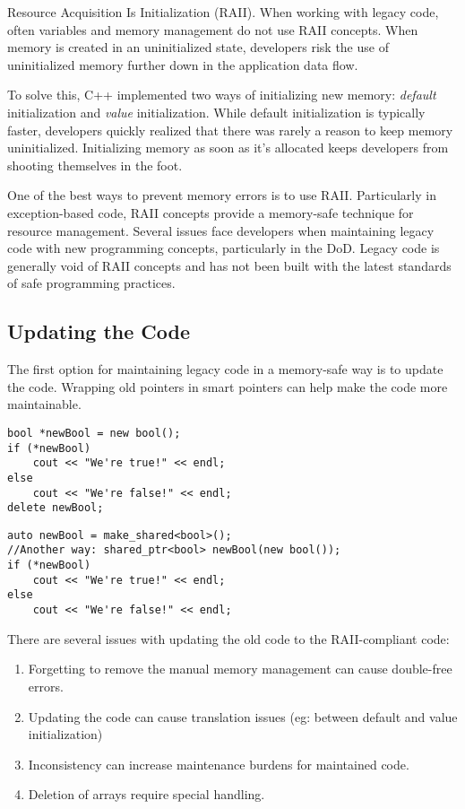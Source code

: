 Resource Acquisition Is Initialization (RAII). When working with legacy code, often variables and memory management do not use RAII concepts. When memory is created in an uninitialized state, developers risk the use of uninitialized memory further down in the application data flow.

To solve this, C++ implemented two ways of initializing new memory: \textit{default} initialization and \textit{value} initialization. While default initialization is typically faster, developers quickly realized that there was rarely a reason to keep memory uninitialized. Initializing memory as soon as it's allocated keeps developers from shooting themselves in the foot.

One of the best ways to prevent memory errors is to use RAII. Particularly in exception-based code, RAII concepts provide a memory-safe technique for resource management.\autocite{20210412-stroustrup2001} Several issues face developers when maintaining legacy code with new programming concepts, particularly in the DoD. Legacy code is generally void of RAII concepts and has not been built with the latest standards of safe programming practices.

\subsection{Updating the Code}

The first option for maintaining legacy code in a memory-safe way is to update the code. Wrapping old pointers in smart pointers can help make the code more maintainable.

\begin{lstlisting}[caption={Non-compliant listing},captionpos=b,style=CStyle,basicstyle=\small]
bool *newBool = new bool();
if (*newBool)
	cout << "We're true!" << endl;
else
	cout << "We're false!" << endl;
delete newBool;
\end{lstlisting}

\begin{lstlisting}[caption={RAII-compliant listing},captionpos=b,style=CStyle,basicstyle=\small]
auto newBool = make_shared<bool>();
//Another way: shared_ptr<bool> newBool(new bool());
if (*newBool)
	cout << "We're true!" << endl;
else
	cout << "We're false!" << endl;
\end{lstlisting}

There are several issues with updating the old code to the RAII-compliant code:
\begin{enumerate}
	\item Forgetting to remove the manual memory management can cause double-free errors.
	\item Updating the code can cause translation issues (eg: between default and value initialization)
	\item Inconsistency can increase maintenance burdens for maintained code.
	\item Deletion of arrays require special handling.
\end{enumerate}

